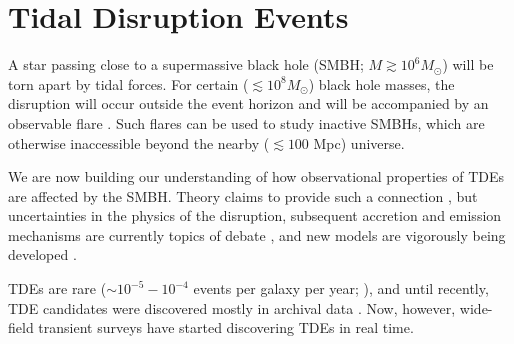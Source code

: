 %
%
%
%
%
%
%
%

\section{Tidal Disruption Events}
\def\secname{tdes}\label{sec:\secname} %


A star passing close to a supermassive black hole (SMBH; $M\gtrsim10^{6}M_{\odot}$)
will be torn apart by tidal forces. For certain ($\lesssim10^{8}M_{\odot}$)
black hole masses, the disruption will occur outside the event horizon
and will be accompanied by an observable flare \citep{Hills1975, Rees1988}.
Such flares can be used to study inactive SMBHs, which are otherwise
inaccessible beyond the nearby ($\lesssim100$ Mpc) universe. 

We are now building our understanding of how observational
properties of TDEs are affected by the SMBH. Theory claims to provide
such a connection \citep[e.g.][]{Lodato2009, Guillochon2014},
but uncertainties in the physics of the disruption, subsequent accretion
and emission mechanisms are currently topics of debate \citep[e.g.][]{Strubbe2015, Guillochon2014, Roth2015}, 
and new models are vigorously being developed \citep[e.g.][]{Piran2015, Hayasaki2015, Svirski2015, Bonnerot2015}. 

TDEs are rare ($\sim10^{-5}-10^{-4}$ events per galaxy per year; \citealp{Wang2004, 
Stone2015}), and until recently, TDE candidates were discovered 
mostly in archival data \citep[e.g.][]{Donley2002, Gezari2006, Esquej2007}. Now, however, wide-field transient
surveys have started discovering TDEs in real time.

